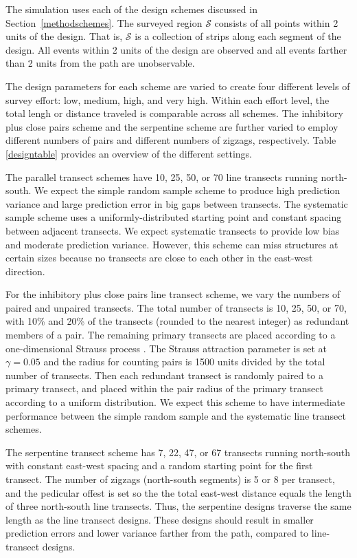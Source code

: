 \documentclass[review]{elsarticle}
\begin{document}
The simulation uses each of the design schemes discussed in
Section~\ref{methodschemes}. The surveyed region \(\mathcal{S}\) consists of
all points within 2 units of the design. That is, \(\mathcal{S}\) is a
collection of strips along each segment of the design. All events within 2
units of the design are observed and all events farther than 2 units from
the path are unobservable.

The design parameters for each scheme are varied to create four different
levels of survey effort: low, medium, high, and very high. Within each effort
level, the total lengh or distance traveled is comparable across all schemes.
The inhibitory plus close pairs scheme and the serpentine scheme are further
varied to employ different numbers of pairs and different numbers of zigzags,
respectively. Table \ref{designtable} provides an overview of the different
settings.

The parallel transect schemes have 10, 25, 50, or 70 line transects running
north-south. We expect the simple random sample scheme to produce high
prediction variance and large prediction error in big gaps between transects.
The systematic sample scheme uses a uniformly-distributed starting point and
constant spacing between adjacent transects. We expect systematic transects to
provide low bias and moderate prediction variance. However, this scheme can
miss structures at certain sizes because no transects are close to each other
in the east-west direction.

For the inhibitory plus close pairs line transect scheme, we vary the numbers of
paired and unpaired transects. The total number of transects is 10, 25, 50, or
70, with 10\% and 20\% of the transects (rounded to the nearest integer) as
redundant members of a pair. The remaining primary transects are placed
according to a one-dimensional Strauss process \citep{strauss,kellyripley}. The
Strauss attraction parameter is set at \(\gamma = 0.05\) and the radius for
counting pairs is 1500 units divided by the total number of transects. Then
each redundant transect is randomly paired to a primary transect, and placed
within the pair radius of the primary transect according to a uniform
distribution. We expect this scheme to have intermediate performance between
the simple random sample and the systematic line transect schemes.

The serpentine transect scheme has 7, 22, 47, or 67 transects running
north-south with constant east-west spacing and a random starting point for the
first transect. The number of zigzags (north-south segments) is 5 or 8 per
transect, and the pedicular offest is set so the the total east-west
distance equals the length of three north-south line transects. Thus, the
serpentine designs traverse the same length as the line transect designs. These
designs should result in smaller prediction errors and lower variance farther
from the path, compared to line-transect designs.
\end{document}
